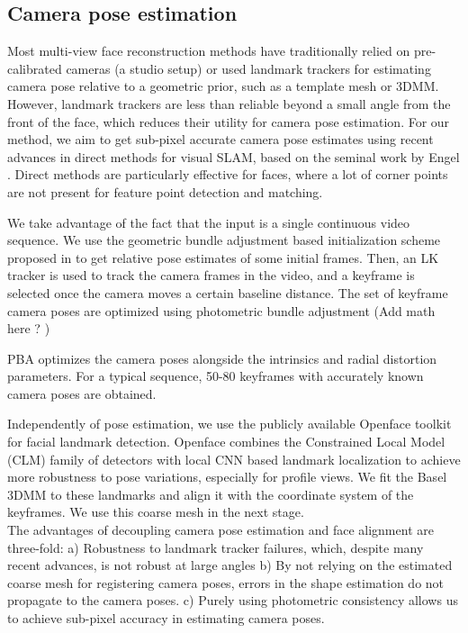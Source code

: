 \documentclass[10pt,twocolumn,letterpaper]{article}
\begin{document}
\subsection{Camera pose estimation} \label{sec:PBA}
Most multi-view face reconstruction methods have traditionally relied on pre-calibrated cameras (a studio setup) or used landmark trackers for estimating camera pose relative to a geometric prior, such as a template mesh or 3DMM. However, landmark trackers are less than reliable beyond a small angle from the front of the face, which reduces their utility for camera pose estimation. For our method, we aim to get sub-pixel accurate camera pose estimates using recent advances in direct methods for visual SLAM, based on the seminal work by Engel \etal \cite{engel2018direct,engel2014lsd}. Direct methods are particularly effective for faces, where a lot of corner points are not present for feature point detection and matching.

We take advantage of the fact that the input is a single continuous video sequence. We use the geometric bundle adjustment based initialization scheme proposed in \cite{ham2017monocular} to get relative pose estimates of some initial frames. Then, an LK tracker is used to track the camera frames in the video, and a keyframe is selected once the camera moves a certain baseline distance. The set of keyframe camera poses are optimized using photometric bundle adjustment (Add math here ? ) 


PBA optimizes the camera poses alongside the intrinsics and radial distortion parameters. For a typical sequence, 50-80 keyframes with accurately known camera poses are obtained.


Independently of pose estimation, we use the publicly available Openface toolkit \cite{baltrusaitis2018openface} for facial landmark detection. Openface combines the Constrained Local Model (CLM) family of detectors with local CNN based landmark localization to achieve more robustness to pose variations, especially for profile views. We fit the Basel 3DMM \cite{blanz1999morphable} to these landmarks and align it with the coordinate system of the keyframes. We use this coarse mesh in the next stage. \\

The advantages of decoupling camera pose estimation and face alignment are three-fold: a) Robustness to landmark tracker failures, which, despite many recent advances, is not robust at large angles  b) By not relying on the estimated coarse mesh for registering camera poses, errors in the shape estimation do not propagate to the camera poses. c) Purely using photometric consistency allows us to achieve sub-pixel accuracy in estimating camera poses. 
\end{document}

